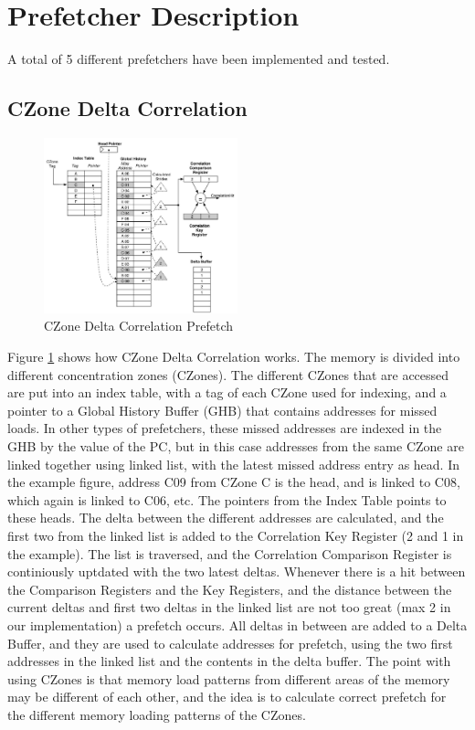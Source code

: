 \documentclass[a4paper]{IEEEtran}
\begin{document}
\section{Prefetcher Description}
A total of 5 different prefetchers have been implemented and tested. 

\subsection{CZone Delta Correlation}

\begin{figure}[h!]
  \centering
      \includegraphics[width=0.5\textwidth]{Figures/CDC}
  \caption{CZone Delta Correlation Prefetch}
  \label{fig:CDC}
\end{figure}

Figure \ref{fig:CDC} shows how CZone Delta Correlation works. 
The memory is divided into different concentration zones (CZones). 
The different CZones that are accessed are put into an index table, with a tag of each CZone used for indexing, and a pointer to a Global History Buffer (GHB) that contains addresses for missed loads. 
In other types of prefetchers, these missed addresses are indexed in the GHB by the value of the PC, but in this case addresses from the same CZone are linked together using linked list, with the latest missed address entry as head. 
In the example figure, address C09 from CZone C is the head, and is linked to C08,  which again is linked to C06, etc. 
The pointers from the Index Table points to these heads.
The delta between the different addresses are calculated, and the first two from the linked list is added to the Correlation Key Register (2 and 1 in the example). 
The list is traversed, and the Correlation Comparison Register is continiously uptdated with the two latest deltas. 
Whenever there is a hit between the Comparison Registers and the Key Registers, and the distance between the current deltas and first two deltas in the linked list are not too great (max 2 in our implementation) a prefetch occurs. 
All deltas in between are added to a Delta Buffer, and they are used to calculate addresses for prefetch, using the two first addresses in the linked list and the contents in the delta buffer. 
The point with using CZones is that memory load patterns from different areas of the memory may be different of each other, and the idea is to calculate correct prefetch for the different memory loading patterns of the CZones.
\end{document}
